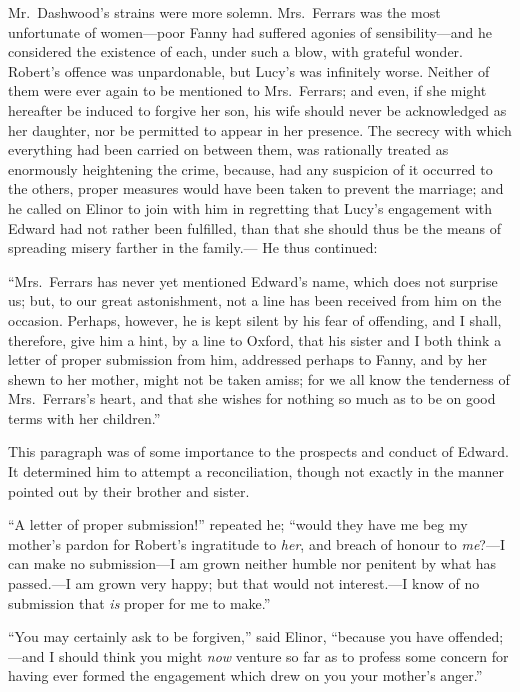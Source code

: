 Mr.\ Dashwood's strains were more solemn.
Mrs.\ Ferrars was the most unfortunate of women---poor
Fanny had suffered agonies of sensibility---and he
considered the existence of each, under such a blow,
with grateful wonder.  Robert's offence was unpardonable,
but Lucy's was infinitely worse.  Neither of them were
ever again to be mentioned to Mrs.\ Ferrars; and even,
if she might hereafter be induced to forgive her son,
his wife should never be acknowledged as her daughter,
nor be permitted to appear in her presence.  The secrecy
with which everything had been carried on between them,
was rationally treated as enormously heightening
the crime, because, had any suspicion of it occurred
to the others, proper measures would have been taken
to prevent the marriage; and he called on Elinor to join
with him in regretting that Lucy's engagement with Edward
had not rather been fulfilled, than that she should thus
be the means of spreading misery farther in the family.---%
He thus continued:

``Mrs.\ Ferrars has never yet mentioned Edward's name,
which does not surprise us; but, to our great astonishment,
not a line has been received from him on the occasion.
Perhaps, however, he is kept silent by his fear of offending,
and I shall, therefore, give him a hint, by a line
to Oxford, that his sister and I both think a letter
of proper submission from him, addressed perhaps to Fanny,
and by her shewn to her mother, might not be taken amiss;
for we all know the tenderness of Mrs.\ Ferrars's heart,
and that she wishes for nothing so much as to be on good terms
with her children.''

This paragraph was of some importance to the
prospects and conduct of Edward.  It determined him
to attempt a reconciliation, though not exactly
in the manner pointed out by their brother and sister.

``A letter of proper submission!'' repeated he;
``would they have me beg my mother's pardon for Robert's
ingratitude to \emph{her}, and breach of honour to \emph{me}?---I can
make no submission---I am grown neither humble nor
penitent by what has passed.---I am grown very happy;
but that would not interest.---I know of no submission
that \emph{is} proper for me to make.''

``You may certainly ask to be forgiven,'' said Elinor,
``because you have offended;---and I should think you
might \emph{now} venture so far as to profess some concern
for having ever formed the engagement which drew on you
your mother's anger.''

